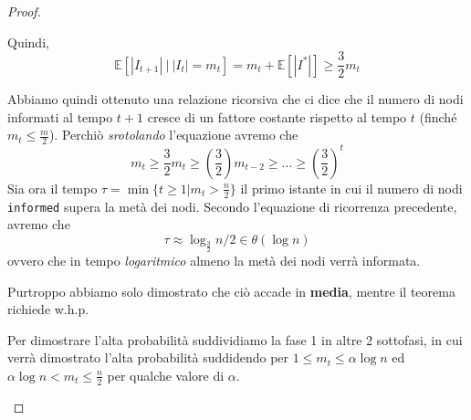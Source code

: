 \begin{teorema}
\begin{proof}
\begin{description}
            Quindi, 
            \[
                \mathbb{E}\left[ |I_{t+1}|\ |\ |I_t| = m_t \right] = m_t + \mathbb{E}[|I^*|] \geq \frac{3}{2}m_t
            \]

            Abbiamo quindi ottenuto una relazione ricorsiva che ci dice che il numero di nodi informati al tempo $t + 1$ cresce di un fattore costante rispetto al tempo $t$ (finché $m_t \leq \frac{m}{2}$). Perchiò \textit{srotolando} l'equazione avremo che
            \[
                m_t \geq \frac{3}{2}m_t \geq \left(\frac{3}{2}\right)m_{t-2} \geq \dots \geq \left(\frac{3}{2}\right)^t
            \]
            Sia ora il tempo $\tau = \min \{t \geq 1 | m_t > \frac{n}{2}\}$ il primo istante in cui il numero di nodi \texttt{informed} supera la metà dei nodi. Secondo l'equazione di ricorrenza precedente, avremo che
            \[
                \tau \approx \log_{\frac{3}{2}} n/2 \in \theta(\log n)
            \]
            ovvero che in tempo \textit{logaritmico} almeno la metà dei nodi verrà informata.

            Purtroppo abbiamo solo dimostrato che ciò accade in \textbf{media}, mentre il teorema richiede w.h.p.

            Per dimostrare l'alta probabilità suddividiamo la fase 1 in altre 2 sottofasi, in cui verrà dimostrato l'alta probabilità suddidendo per $1 \leq m_t \leq \alpha \log n$ ed $\alpha \log n < m_t \leq \frac{n}{2}$ per qualche valore di $\alpha$.


\end{description}
\end{proof}
\end{teorema}
